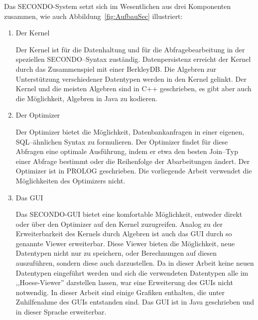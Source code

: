 Das SECONDO-System setzt sich im Wesentlichen aus drei Komponenten zusammen, wie auch Abbildung~\vref{fig:AufbauSec} illustriert:
\begin{enumerate}
\item Der Kernel

Der Kernel ist für die Datenhaltung und für die Abfragebearbeitung in der speziellen SECONDO--Syntax zuständig. Datenpersistenz erreicht der Kernel durch das Zusammenspiel mit einer BerkleyDB. Die Algebren zur Unterstützung verschiedener Datentypen werden in den Kernel gelinkt. Der Kernel und die meisten Algebren sind in C++ geschrieben, es gibt aber auch die Möglichkeit, Algebren in Java zu kodieren.

\item Der Optimizer

Der Optimizer bietet die Möglichkeit, Datenbankanfragen in einer eigenen, SQL--ähnlichen Syntax zu formulieren. Der Optimizer findet für diese Abfragen eine optimale Ausführung, indem er etwa den besten Join--Typ einer Abfrage bestimmt oder die Reihenfolge der Abarbeitungen ändert. Der Optimizer ist in PROLOG geschrieben. Die vorliegende Arbeit verwendet die Möglichkeiten des Optimizers nicht.

\item Das GUI

Das SECONDO-GUI bietet eine komfortable Möglichkeit, entweder direkt oder  über den Optimizer  auf den Kernel zuzugreifen. Analog zu der Erweiterbarkeit des Kernels durch Algebren ist auch das GUI durch so genannte Viewer erweiterbar. Diese Viewer bieten die Möglichkeit, neue Datentypen nicht nur zu speichern, oder Berechnungen auf diesen auszuführen, sondern diese auch darzustellen. Da in dieser Arbeit keine neuen Datentypen eingeführt werden und sich die verwendeten Datentypen alle im ,,Hoese-Viewer'' darstellen lassen, war eine Erweiterung des GUIs nicht notwendig. In dieser Arbeit sind einige Grafiken enthalten, die unter Zuhilfenahme des GUIs entstanden sind. Das GUI ist in Java geschrieben und in dieser Sprache erweiterbar.

\end{enumerate}
